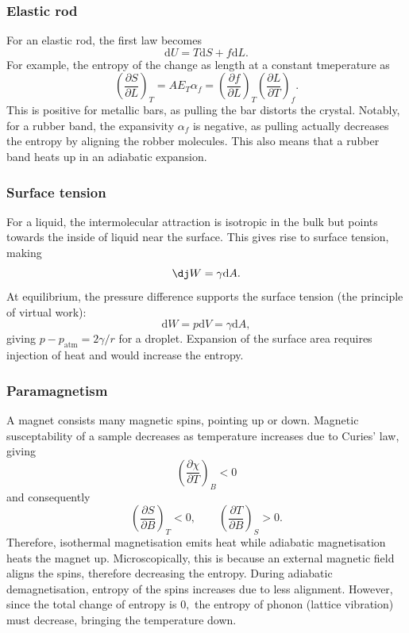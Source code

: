 \documentclass{article}
\theoremstyle{nonumberplain}
\begin{document}
\subsubsection{Elastic rod}
For an elastic rod, the first law becomes
\[
    \mathrm{d} U = T \mathrm{d} S + f \mathrm{d} L. 
\]
For example, the entropy of the change as length at a constant tmeperature as
\[
    \left( \frac{\partial S}{\partial L} \right)_{T} = A E_T \alpha_f = \left( \frac{\partial f}{\partial L} \right)_{T} \left( \frac{\partial L}{\partial T} \right)_{f}. 
\]
This is positive for metallic bars, as pulling the bar distorts the crystal. Notably, for a rubber band, the expansivity $\alpha_f$ is negative, as pulling actually decreases the entropy by aligning the robber molecules. This also means that a rubber band heats up in an adiabatic expansion. 

\subsubsection{Surface tension}
For a liquid, the intermolecular attraction is isotropic in the bulk but points towards the inside of liquid near the surface. This gives rise to surface tension, making 
\[
    \mathrm{\dj} W = \gamma \mathrm{d} A. 
\]
At equilibrium, the pressure difference supports the surface tension (the principle of virtual work):
\[
    \mathrm{d} W = p \mathrm{d} V = \gamma \mathrm{d} A,
    \] 
giving $p - p_{\mathrm{atm} } = 2\gamma /r$ for a droplet. Expansion of the surface area requires injection of heat and would increase the entropy.

\subsubsection{Paramagnetism}
A magnet consists many magnetic spins, pointing up or down. Magnetic susceptability of a sample decreases as temperature increases due to Curies' law, giving 
\[
    \left( \frac{\partial \chi }{\partial T} \right)_{B} < 0
\]
and consequently
\[
    \left( \frac{\partial S}{\partial B} \right)_{T} < 0, \qquad
    \left( \frac{\partial T}{\partial B} \right)_{S} > 0. 
\]
Therefore, isothermal magnetisation emits heat while adiabatic magnetisation heats the magnet up. Microscopically, this is because an external magnetic field aligns the spins, therefore decreasing the entropy. During adiabatic demagnetisation, entropy of the spins increases due to less alignment. However, since the total change of entropy is $0,$ the entropy of phonon (lattice vibration) must decrease, bringing the temperature down.
\end{document}
